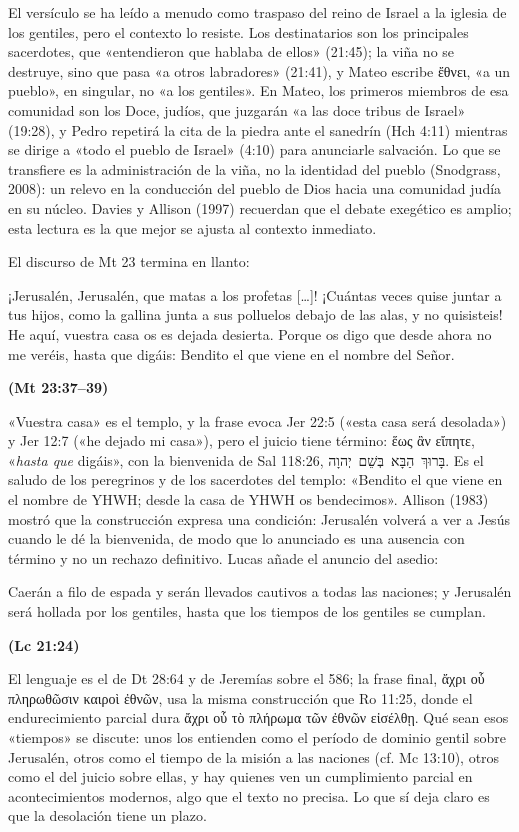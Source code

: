 \documentclass[11pt,letterpaper]{article}
\newcommand{\heb}[1]{\mbox{\foreignlanguage{hebrew}{#1}}}
\newcommand{\grc}[1]{\foreignlanguage{ancientgreek}{#1}}
\newcommand{\fuente}[1]{\par\hfill{\upshape\bfseries\small\textcolor{ladrillo}{#1}}}
\begin{document}
El versículo se ha leído a menudo como traspaso del reino de Israel a la iglesia de los gentiles, pero el contexto lo resiste. Los destinatarios son los principales sacerdotes, que «entendieron que hablaba de ellos» (21:45); la viña no se destruye, sino que pasa «a otros labradores» (21:41), y Mateo escribe \grc{ἔθνει}, «a un pueblo», en singular, no «a los gentiles». En Mateo, los primeros miembros de esa comunidad son los Doce, judíos, que juzgarán «a las doce tribus de Israel» (19:28), y Pedro repetirá la cita de la piedra ante el sanedrín (Hch 4:11) mientras se dirige a «todo el pueblo de Israel» (4:10) para anunciarle salvación. Lo que se transfiere es la administración de la viña, no la identidad del pueblo (Snodgrass, 2008): un relevo en la conducción del pueblo de Dios hacia una comunidad judía en su núcleo. Davies y Allison (1997) recuerdan que el debate exegético es amplio; esta lectura es la que mejor se ajusta al contexto inmediato.

El discurso de Mt 23 termina en llanto:

\begin{cita}¡Jerusalén, Jerusalén, que matas a los profetas [\ldots]! ¡Cuántas veces quise juntar a tus hijos, como la gallina junta a sus polluelos debajo de las alas, y no quisisteis! He aquí, vuestra casa os es dejada desierta. Porque os digo que desde ahora no me veréis, hasta que digáis: Bendito el que viene en el nombre del Señor.\fuente{(Mt 23:37--39)}\end{cita}

«Vuestra casa» es el templo, y la frase evoca Jer 22:5 («esta casa será desolada») y Jer 12:7 («he dejado mi casa»), pero el juicio tiene término: \grc{ἕως ἂν εἴπητε}, «\emph{hasta que} digáis», con la bienvenida de Sal 118:26, \heb{בָּרוּךְ הַבָּא בְּשֵׁם יְהוָה}. Es el saludo de los peregrinos y de los sacerdotes del templo: «Bendito el que viene en el nombre de YHWH; desde la casa de YHWH os bendecimos». Allison (1983) mostró que la construcción expresa una condición: Jerusalén volverá a ver a Jesús cuando le dé la bienvenida, de modo que lo anunciado es una ausencia con término y no un rechazo definitivo. Lucas añade el anuncio del asedio:

\begin{cita}Caerán a filo de espada y serán llevados cautivos a todas las naciones; y Jerusalén será hollada por los gentiles, hasta que los tiempos de los gentiles se cumplan.\fuente{(Lc 21:24)}\end{cita}

El lenguaje es el de Dt 28:64 y de Jeremías sobre el 586; la frase final, \grc{ἄχρι οὗ πληρωθῶσιν καιροὶ ἐθνῶν}, usa la misma construcción que Ro 11:25, donde el endurecimiento parcial dura \grc{ἄχρι οὗ τὸ πλήρωμα τῶν ἐθνῶν εἰσέλθῃ}. Qué sean esos «tiempos» se discute: unos los entienden como el período de dominio gentil sobre Jerusalén, otros como el tiempo de la misión a las naciones (cf. Mc 13:10), otros como el del juicio sobre ellas, y hay quienes ven un cumplimiento parcial en acontecimientos modernos, algo que el texto no precisa. Lo que sí deja claro es que la desolación tiene un plazo.
\end{document}
